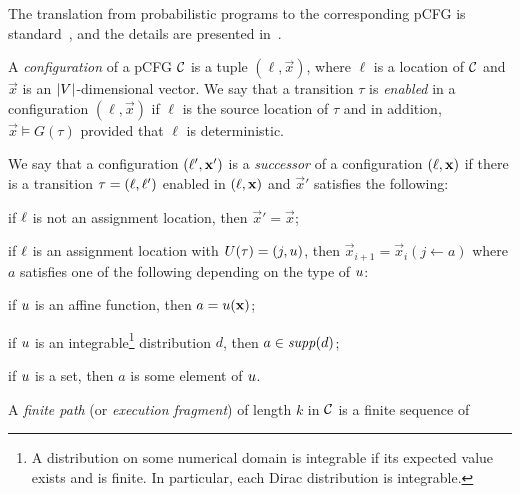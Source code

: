 The translation from probabilistic programs to the corresponding pCFG is 
standard~\cite{CFNH16:prob-termination}, and the details are presented 
in~\AppendixMaterial.

\smallskip{}
A \emph{configuration} of a pCFG $\mathcal{C}$ is a tuple $(\ell,\vec{x})$,
where $\ell$ is a location of $\mathcal{C}$ and $\vec{x}$ is an 
$|V|$-dimensional vector.
We say that a transition $\tau$ is \emph{enabled} in a configuration
$(\ell,\vec{x})$ if $\ell$ is the source location of $\tau$ and in addition,
${\vec{x}}\models G(\tau)$ provided that $\ell$ is deterministic. 

\smallskip{}
We say that a configuration $(\ell',\mathbf{x}')$ is a \emph{successor} of a 
configuration $(\ell,\mathbf{x})$ if 
there is a transition  $\tau=(\ell,\ell')$ enabled in
$(\ell,\mathbf{x})$ 
and $\vec{x}'$ satisfies the following:
\begin{compactitem}
\item if $\ell$ is not an assignment location, then $\vec{x}'=\vec{x}$;
\item if $\ell$ is an assignment location with $U(\tau)=(j,u)$, then 
$\vec{x}_{i+1}=\vec{x}_i(j\leftarrow a)$ where $a$ satisfies one of the 
following 
depending on the type of $u$:
\begin{compactitem}
\item if $u$ is an affine function, then $a=u(\mathbf{x})$;
\item if $u$ is an integrable\footnote{A distribution on some numerical 
domain 
is integrable if its expected value exists and is finite. In particular, each 
Dirac distribution is integrable.} distribution $d$, then 
$a\in \mathit{supp}(d)$;
\item if $u$ is a set, then $a$ is some element of $u$.
\end{compactitem}
\end{compactitem}
A \emph{finite path} (or
\emph{execution fragment}) of length $k$ in $\mathcal{C}$ is a finite sequence of
